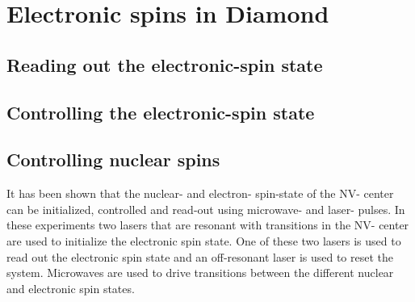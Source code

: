 \chapter{Electronic spins in Diamond}
\label{controlingspinsindiamond}


\section{Reading out the electronic-spin state}

\section{Controlling the electronic-spin state}

\section{Controlling nuclear spins}



















It has been shown that the nuclear- and electron- spin-state of the NV- center can be initialized, controlled and read-out using microwave- and laser- pulses\citep{Robledo2011HighFidelity}. In these experiments two lasers that are resonant with transitions in the NV- center are used to initialize the electronic spin state.
One of these two lasers is used to read out the electronic spin state and an off-resonant laser is used to reset the system. Microwaves are used to drive transitions between the different nuclear and electronic spin states.

